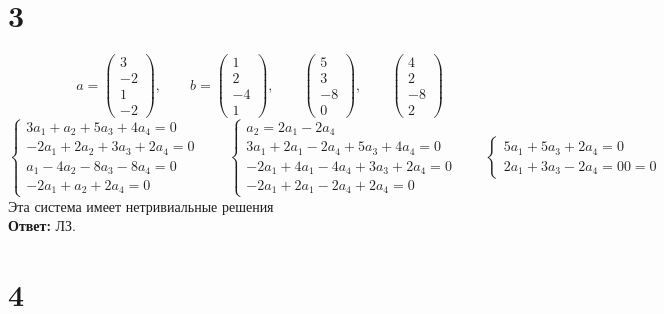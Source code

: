 \section{3}

$$ a =
\begin{pmatrix}
	3 \\
    -2 \\
    1 \\
    -2
\end{pmatrix}, \qquad b =
\begin{pmatrix}
	1 \\
    2 \\
    -4 \\
    1
\end{pmatrix}, \qquad
\begin{pmatrix}
	5 \\
    3 \\
    -8 \\
    0
\end{pmatrix}, \qquad
\begin{pmatrix}
	4 \\
    2 \\
    -8 \\
    2
\end{pmatrix} $$
$$
\begin{cases}
	3a_1 + a_2 + 5a_3 + 4a_4 = 0 \\
    -2a_1 + 2a_2 + 3a_3 + 2a_4 = 0 \\
    a_1 - 4a_2 - 8a_3 - 8a_4 = 0 \\
    -2a_1 + a_2 + 2a_4 = 0
\end{cases} \qquad
\begin{cases}
	a_2 = 2a_1 - 2a_4 \\
    3a_1 + 2a_1 - 2a_4 + 5a_3 + 4a_4 = 0 \\
    -2a_1 + 4a_1 - 4a_4 + 3a_3 + 2a_4 = 0 \\
    -2a_1 + 2a_1 - 2a_4 + 2a_4 = 0
\end{cases} \qquad
\begin{cases}
	5a_1 + 5a_3 + 2a_4 = 0 \\
    2a_1 + 3a_3 - 2a_4 = 0
    0 = 0
\end{cases} $$
Эта система имеет нетривиальные решения \\
\textbf{Ответ:} ЛЗ.

\section{4}


